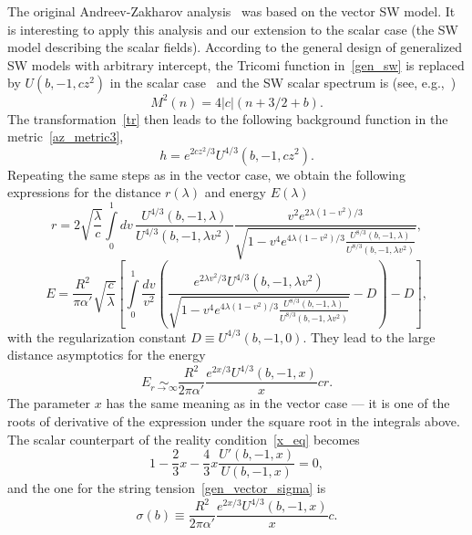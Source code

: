 \documentclass[a4paper,11pt]{article}
\newcommand{\lb}[0]{\left(}
\newcommand{\rb}[0]{\right)}
\newcommand{\lsb}{\left[}
\newcommand{\rsb}{\right]}
\begin{document}
The original Andreev-Zakharov analysis~\cite{Andreev:2006ct} was based on the vector SW model.
It is interesting to apply this analysis and our extension to the scalar case (the SW model
describing the scalar fields). According to the general design of generalized SW models with
arbitrary intercept, the Tricomi function in~\eqref{gen_sw} is replaced by $U(b,-1,cz^2)$ in
the scalar case~\cite{Afonin:2021cwo} and the SW scalar spectrum is (see, e.g.,~\cite{Afonin:2021cwo})
\begin{equation}
\label{spSW3}
  M^2(n)=4|c|(n+3/2+b).
\end{equation}
The transformation~\eqref{tr} then leads to the following
background function in the metric~\eqref{az_metric3},
\begin{equation}
  h=e^{2cz^2/3}U^{4/3}(b,-1,cz^2).
\end{equation}
Repeating the same steps as in the vector case, we obtain the following expressions for
the distance \(r(\lambda)\) and energy \(E(\lambda)\)
\begin{equation}
  r=2\sqrt{\frac{\lambda}{c}}\int\limits_0^1dv\,
  \frac{U^{4/3}(b,-1,\lambda)}{U^{4/3}(b,-1,\lambda v^2)}
  \frac{v^2e^{2\lambda(1-v^2)/3}}
  {\sqrt{1-v^4e^{4\lambda(1-v^2)/3}\frac{U^{8/3}(b,-1,\lambda)}{U^{8/3}(b,-1,\lambda v^2)}}},
\end{equation}
\begin{equation}
  E=\frac{R^2}{\pi\alpha'}\sqrt{\frac{c}{\lambda}}\lsb\int\limits_0^1\frac{dv}{v^2}\lb
  \frac{e^{2\lambda v^2/3}U^{4/3}(b,-1,\lambda v^2)}{\sqrt{1-v^4e^{4\lambda(1-v^2)/3}\frac{U^{8/3}(b,-1,\lambda)}{U^{8/3}(b,-1,\lambda v^2)}}}-D\rb-D\rsb,
\end{equation}
with the regularization constant \(D\equiv U^{4/3}(b,-1,0)\). They
lead to the large distance asymptotics for the energy
\begin{equation}
  E\underset{r\to\infty}{\sim}\frac{R^2}{2\pi\alpha'}\frac{e^{2x/3}U^{4/3}(b,-1,x)}{x}cr.
\end{equation}
The parameter \(x\) has the same meaning as in the vector case --- it is
one of the roots of derivative of the expression under the square root in the integrals above.
The scalar counterpart of the reality condition~\eqref{x_eq} becomes
\begin{equation}
\label{realscalar}
  1-\frac{2}{3}x-\frac{4}{3}x\frac{U'(b,-1,x)}{U(b,-1,x)}=0,
\end{equation}
and the one for the string tension~\eqref{gen_vector_sigma} is
\begin{equation}
\label{stringscalar}
  \sigma(b)\equiv\frac{R^2}{2\pi\alpha'}\frac{e^{2x/3}U^{4/3}(b,-1,x)}{x}c.
\end{equation}
\end{document}
